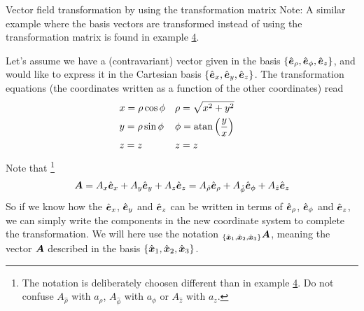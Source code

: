 \documentclass[a4paper, 12pt]{article}
\begin{document}
\begin{example}{Vector field transformation by using the transformation matrix}
 \label{ex:vft}
 Note: A similar example where the basis vectors are transformed instead of
 using the transformation matrix is found in example \hyperref[ex:tbs]{4}.

 Let's assume we have a (contravariant) vector given in the basis
 $\{\hat{\boldsymbol{e}}_\rho,
 \hat{\boldsymbol{e}}_\phi, \hat{\boldsymbol{e}}_z\}$, and would like to express it in the Cartesian basis
 $\{\hat{\boldsymbol{e}}_x, \hat{\boldsymbol{e}}_y, \hat{\boldsymbol{e}}_z\}$. The transformation equations (the
 coordinates
 written as a function of the other coordinates) read
 \begin{align*}
  &x = \rho \cos\phi&
  &\rho = \sqrt{x^2+y^2}&
  \\
  &y = \rho \sin\phi&
  &\phi = \text{atan}\left(\frac{y}{x}\right)&
  \\
  &z=z&
  &z=z&
 \end{align*}
 Note that%
 \footnote{The notation is deliberately choosen different than in example
           \hyperref[ex:tbs]{4}. Do not confuse $A_{\hat{\rho}}$ with
           $a_\rho$, $A_{\hat{\phi}}$ with $a_\phi$ or $A_{\hat{z}}$ with
           $a_z$.}
 \begin{align}
  \boldsymbol{A} =
  A_x \hat{\boldsymbol{e}}_x + A_y \hat{\boldsymbol{e}}_y + A_z \hat{\boldsymbol{e}}_z =
  A_{\hat{\rho}} \hat{\boldsymbol{e}}_\rho + A_{\hat{\phi}} \hat{\boldsymbol{e}}_\phi + A_{\hat{z}} \hat{\boldsymbol{e}}_z
  \label{eq:component}
 \end{align}
 So if we know how the $\hat{\boldsymbol{e}}_x$, $\hat{\boldsymbol{e}}_y$ and $\hat{\boldsymbol{e}}_z$ can be written in
terms
 of $\hat{\boldsymbol{e}}_\rho$, $\hat{\boldsymbol{e}}_\phi$ and $\hat{\boldsymbol{e}}_z$, we can simply write the
components
 in the new coordinate system to complete the transformation. We will here use
 the notation $_{\{\hat{\boldsymbol{x}}_1, \hat{\boldsymbol{x}}_2, \hat{\boldsymbol{x}}_3\}} \boldsymbol{A}$, meaning the vector
 $\boldsymbol{A}$ described in the basis ${\{\hat{\boldsymbol{x}}_1, \hat{\boldsymbol{x}}_2, \hat{\boldsymbol{x}}_3\}}$.


\end{example}
\end{document}
